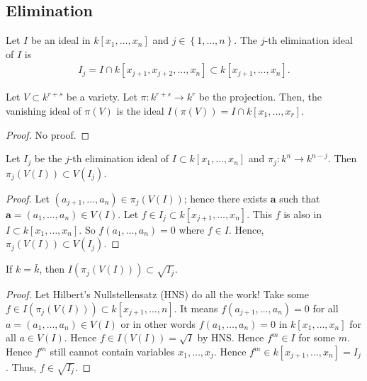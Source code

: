 \subsection{Elimination}


\begin{defi}
Let \( I  \) be an ideal in \( k[x_1, \dots, x_n] \) and \( j \in \left\{ 1, \dots, n \right\} \). The \( j \)-th elimination ideal of \( I \) is 
\begin{align*}
  I_j = I \cap k[x_{j+1}, x_{j+2}, \dots, x_n] \subset k[x_{j+1}, \dots, x_n].
\end{align*}
\end{defi}


\begin{prop}
  Let \( V \subset k^{r + s} \) be a variety. Let \( \pi: k^{r + s} \to k^{r} \) be the projection. Then, the vanishing ideal of \( \pi(V) \) is the ideal \( I(\pi(V)) = I \cap k[x_1, \dots, x_r] \).
\end{prop}

\begin{proof}
  No proof.
\end{proof}

\begin{lemma}\label{lem:image-of-variety-under-projection}
  Let \( I_j \) be the \( j \)-th elimination ideal of \( I \subset k[x_1, \dots, x_n] \) and \( \pi_j : k^n \to k^{n - j} \). Then \(   \pi_j(V(I)) \subset V(I_j)
  \).
\end{lemma}
\begin{proof}
  Let \( (a_{j+1}, \dots, a_n) \in \pi_j(V(I)) \); hence there exists \( \mathbf{a} \) such that \( \mathbf a = (a_1, \dots, a_n) \in V(I) \). Let \( f \in I_j \subset k[x_{j+1}, \dots, x_n] \). This \( f \) is also in \( I \subset k[x_1, \dots, x_n] \). So \( f(a_1, ... , a_n) = 0 \) where \( f \in I \). Hence, \( \pi_j (V(I)) \subset V(I_j) \).
\end{proof}

\begin{lemma}\label{lem:closure-theorem-lemma}
  If \( k = \bar k \), then \( I(\pi_j(V(I))) \subset \sqrt{I_j} \).
\end{lemma}

\begin{proof}
  Let Hilbert's Nullstellensatz (HNS) do all the work!
  Take some \( f \in I(\pi_j(V(I))) \subset k [x_{j+1}, \dots, n] \). It means \( f(a_{j+1}, \dots, a_n) = 0 \) for all \( a = (a_1, \dots, a_n) \in V(I) \) or in other words \( f(a_1, \dots, a_n)  = 0 \) in \( k[x_1, \dots, x_n] \) for all \( a \in V(I) \). Hence \( f \in I(V(I)) = \sqrt I \) by HNS. Hence \( f^m \in I \) for some \( m \). Hence \( f^m \) still cannot contain variables \( x_1, \dots, x_j \). Hence \( f^m \in k[x_{j+1}, \dots, x_n] = I_j \). Thus, \( f \in \sqrt{I_j} \).
\end{proof}


